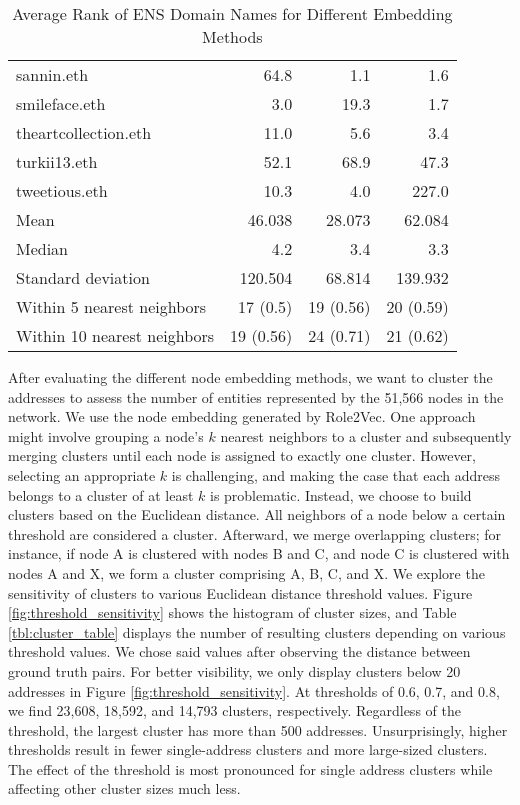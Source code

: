 \documentclass[12pt,a4paper,titlepage,oneside,english]{article}
\begin{document}
\begin{table}[h!]
\begin{tabular}{lrrr}
	sannin.eth & 64.8 & 1.1 & 1.6 \\
	smileface.eth & 3.0 & 19.3 & 1.7 \\
	theartcollection.eth & 11.0 & 5.6 & 3.4 \\
	turkii13.eth & 52.1 & 68.9 & 47.3 \\
	tweetious.eth & 10.3 & 4.0 & 227.0 \\
    \hline
    Mean & 46.038 & 28.073 & 62.084 \\
    Median & 4.2 & 3.4 & 3.3 \\
    Standard deviation & 120.504 & 68.814 &  139.932\\
    Within 5 nearest neighbors & 17 (0.5) & 19 (0.56) & 20 (0.59) \\
    Within 10 nearest neighbors & 19 (0.56) & 24 (0.71) & 21 (0.62)\\
    \hline
  \end{tabular}
  \caption{Average Rank of ENS Domain Names for Different Embedding Methods}
  \label{tbl:ENS_Domain_Ranks}
\end{table}

After evaluating the different node embedding methods, we want to cluster the addresses to assess the number of entities represented by the 51,566 nodes in the network. We use the node embedding generated by Role2Vec. \newline
One approach might involve grouping a node's $k$ nearest neighbors to a cluster and subsequently merging clusters until each node is assigned to exactly one cluster. However, selecting an appropriate $k$ is challenging, and making the case that each address belongs to a cluster of at least $k$ is problematic. \newline
Instead, we choose to build clusters based on the Euclidean distance. All neighbors of a node below a certain threshold are considered a cluster. Afterward, we merge overlapping clusters; for instance, if node A is clustered with nodes B and C, and node C is clustered with nodes A and X, we form a cluster comprising A, B, C, and X. \newline
We explore the sensitivity of clusters to various Euclidean distance threshold values. Figure \ref{fig:threshold_sensitivity} shows the histogram of cluster sizes, and Table \ref{tbl:cluster_table} displays the number of resulting clusters depending on various threshold values. We chose said values after observing the distance between ground truth pairs. For better visibility, we only display clusters below 20 addresses in Figure \ref{fig:threshold_sensitivity}. At thresholds of 0.6, 0.7, and 0.8, we find 23,608, 18,592, and 14,793 clusters, respectively. Regardless of the threshold, the largest cluster has more than 500 addresses. Unsurprisingly, higher thresholds result in fewer single-address clusters and more large-sized clusters. The effect of the threshold is most pronounced for single address clusters while affecting other cluster sizes much less. 
\end{document}

